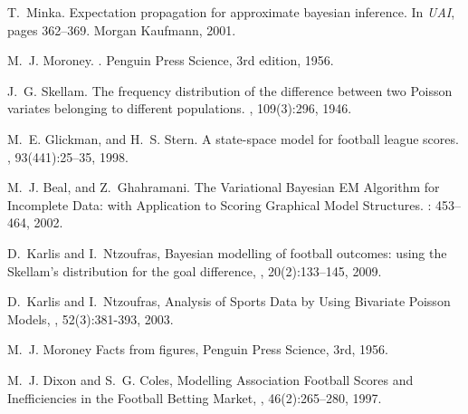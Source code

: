 \documentclass[runningheads,a4paper]{llncs}
\begin{document}
\begin{thebibliography}{}
T.~Minka.
\newblock Expectation propagation for approximate bayesian inference.
\newblock In {\em UAI}, pages
  362--369. Morgan Kaufmann, 2001.



M.~J. Moroney.
.
\newblock Penguin Press Science, 3rd edition, 1956.

J.~G. Skellam.
\newblock The frequency distribution of the difference between two
{P}oisson variates belonging to different populations.
, 109(3):296,
  1946.

M.~E. Glickman, and H.~S. Stern.
\newblock A state-space model for football league scores.
, 93(441):25--35,
  1998.

M.~J. Beal, and Z.~Ghahramani.
\newblock The Variational {B}ayesian {EM} Algorithm for Incomplete Data: with
	Application to Scoring Graphical Model Structures.
: 453--464,
2002.

D.~Karlis and I.~Ntzoufras,
\newblock Bayesian modelling of football outcomes: using the {S}kellam's distribution
	for the goal difference,
, 20(2):133--145, 2009.

D.~Karlis and I.~Ntzoufras,
\newblock Analysis of Sports Data by Using Bivariate {P}oisson Models,
, 52(3):381-393, 2003.

M.~J. Moroney
\newblock Facts from figures,
\newblock Penguin Press Science, 3rd, 1956.

M.~J. Dixon and S.~G. Coles,
\newblock Modelling Association Football Scores and Inefficiencies in the Football Betting Market,
, 46(2):265--280, 1997.

\end{thebibliography}
\end{document}
